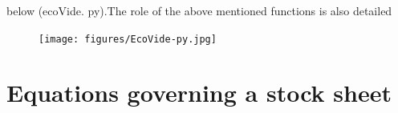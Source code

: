 \documentclass[12pt,a4paper]{article}%
\begin{document}
\begin{appendix}
below (ecoVide. py).\newline The role of the above mentioned functions is also detailed \begin{figure}[h] \texttt{[image: figures/EcoVide-py.jpg]}\end{figure}  

\section{Equations governing a stock sheet}  
\end{appendix}
\end{document}
